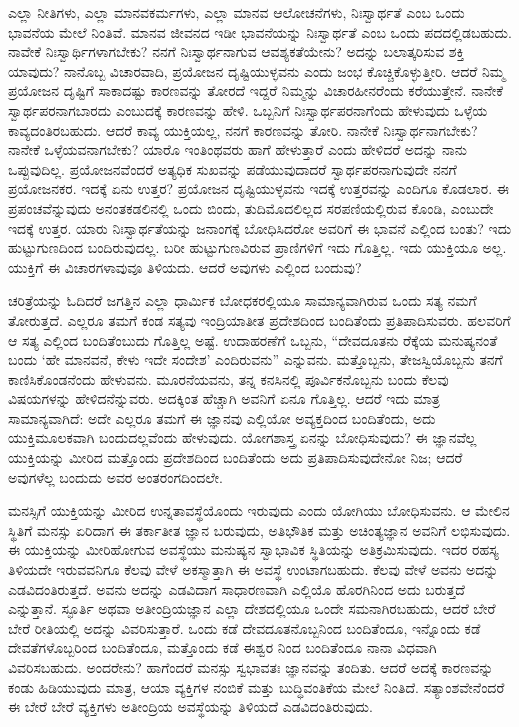 \vskip 0.3cm

ಎಲ್ಲಾ ನೀತಿಗಳು, ಎಲ್ಲಾ ಮಾನವಕರ್ಮಗಳು, ಎಲ್ಲಾ ಮಾನವ ಆಲೋಚನೆಗಳು, ನಿಃಸ್ವಾರ್ಥತೆ ಎಂಬ ಒಂದು ಭಾವನೆಯ ಮೇಲೆ ನಿಂತಿವೆ. ಮಾನವ ಜೀವನದ ಇಡೀ ಭಾವನೆಯನ್ನು ನಿಃಸ್ವಾರ್ಥತೆ ಎಂಬ ಒಂದು ಪದದಲ್ಲಿಡಬಹುದು. ನಾವೇಕೆ ನಿಃಸ್ವಾರ್ಥಿಗಳಾಗಬೇಕು? ನನಗೆ ನಿಃಸ್ವಾರ್ಥನಾಗುವ ಆವಶ್ಯಕತೆಯೇನು? ಅದನ್ನು ಬಲಾತ್ಕರಿಸುವ ಶಕ್ತಿ ಯಾವುದು? ನಾನೊಬ್ಬ ವಿಚಾರವಾದಿ, ಪ್ರಯೋಜನ ದೃಷ್ಟಿಯುಳ್ಳವನು ಎಂದು ಜಂಭ ಕೊಚ್ಚಿಕೊಳ್ಳುತ್ತೀರಿ. ಆದರೆ ನಿಮ್ಮ ಪ್ರಯೋಜನ ದೃಷ್ಟಿಗೆ ಸಾಕಾದಷ್ಟು ಕಾರಣವನ್ನು ತೋರದೆ ಇದ್ದರೆ ನಿಮ್ಮನ್ನು ವಿಚಾರಹೀನರೆಂದು ಕರೆಯುತ್ತೇನೆ. ನಾನೇಕೆ ಸ್ವಾರ್ಥಪರನಾಗಬಾರದು ಎಂಬುದಕ್ಕೆ ಕಾರಣವನ್ನು ಹೇಳಿ. ಒಬ್ಬನಿಗೆ ನಿಃಸ್ವಾರ್ಥಪರನಾಗೆಂದು ಹೇಳುವುದು ಒಳ್ಳೆಯ ಕಾವ್ಯದಂತಿರಬಹುದು. ಆದರೆ ಕಾವ್ಯ ಯುಕ್ತಿಯಲ್ಲ, ನನಗೆ ಕಾರಣವನ್ನು ತೋರಿ. ನಾನೇಕೆ ನಿಃಸ್ವಾರ್ಥನಾಗಬೇಕು? ನಾನೇಕೆ ಒಳ್ಳೆಯವನಾಗಬೇಕು? ಯಾರೊ ಇಂತಿಂಥವರು ಹಾಗೆ ಹೇಳುತ್ತಾರೆ ಎಂದು ಹೇಳಿದರೆ ಅದನ್ನು ನಾನು ಒಪ್ಪುವುದಿಲ್ಲ. ಪ್ರಯೋಜನವೆಂದರೆ ಅತ್ಯಧಿಕ ಸುಖವನ್ನು ಪಡೆಯುವುದಾದರೆ ಸ್ವಾರ್ಥಪರನಾಗುವುದೇ ನನಗೆ ಪ್ರಯೋಜನಕರ. ಇದಕ್ಕೆ ಏನು ಉತ್ತರ? ಪ್ರಯೋಜನ ದೃಷ್ಟಿಯುಳ್ಳವನು ಇದಕ್ಕೆ ಉತ್ತರವನ್ನು ಎಂದಿಗೂ ಕೊಡಲಾರ. ಈ ಪ್ರಪಂಚವೆನ್ನುವುದು ಅನಂತಕಡಲಿನಲ್ಲಿ ಒಂದು ಬಿಂದು, ತುದಿಮೊದಲಿಲ್ಲದ ಸರಪಣಿಯಲ್ಲಿರುವ ಕೊಂಡಿ, ಎಂಬುದೇ ಇದಕ್ಕೆ ಉತ್ತರ. ಯಾರು ನಿಃಸ್ವಾರ್ಥತೆಯನ್ನು ಜನಾಂಗಕ್ಕೆ ಬೋಧಿಸಿದರೋ ಅವರಿಗೆ ಈ ಭಾವನೆ ಎಲ್ಲಿಂದ ಬಂತು? ಇದು ಹುಟ್ಟುಗುಣದಿಂದ ಬಂದಿರುವುದಲ್ಲ. ಬರೀ ಹುಟ್ಟುಗುಣವಿರುವ ಪ್ರಾಣಿಗಳಿಗೆ ಇದು ಗೊತ್ತಿಲ್ಲ. ಇದು ಯುಕ್ತಿಯೂ ಅಲ್ಲ. ಯುಕ್ತಿಗೆ ಈ ವಿಚಾರಗಳಾವುವೂ ತಿಳಿಯದು. ಆದರೆ ಅವುಗಳು ಎಲ್ಲಿಂದ ಬಂದುವು?

\vskip 0.3cm

ಚರಿತ್ರೆಯನ್ನು ಓದಿದರೆ ಜಗತ್ತಿನ ಎಲ್ಲಾ ಧಾರ್ಮಿಕ ಬೋಧಕರಲ್ಲಿಯೂ ಸಾಮಾನ್ಯವಾಗಿರುವ ಒಂದು ಸತ್ಯ ನಮಗೆ ತೋರುತ್ತದೆ. ಎಲ್ಲರೂ ತಮಗೆ ಕಂಡ ಸತ್ಯವು ಇಂದ್ರಿಯಾತೀತ ಪ್ರದೇಶದಿಂದ ಬಂದಿತೆಂದು ಪ್ರತಿಪಾದಿಸುವರು. ಹಲವರಿಗೆ ಆ ಸತ್ಯ ಎಲ್ಲಿಂದ ಬಂದಿತೆಂಬುದು ಗೊತ್ತಿಲ್ಲ ಅಷ್ಟೆ. ಉದಾಹರಣೆಗೆ ಒಬ್ಬನು, “ದೇವದೂತನು ರೆಕ್ಕೆಯ ಮನುಷ್ಯನಂತೆ ಬಂದು ‘ಹೇ ಮಾನವನೆ, ಕೇಳು ಇದೇ ಸಂದೇಶ’ ಎಂದಿರುವನು” ಎನ್ನುವನು. ಮತ್ತೊಬ್ಬನು, ತೇಜಸ್ವಿಯೊಬ್ಬನು ತನಗೆ ಕಾಣಿಸಿಕೊಂಡನೆಂದು ಹೇಳುವನು. ಮೂರನೆಯವನು, ತನ್ನ ಕನಸಿನಲ್ಲಿ ಪೂರ್ವಿಕನೊಬ್ಬನು ಬಂದು ಕೆಲವು ವಿಷಯಗಳನ್ನು ಹೇಳಿದನೆನ್ನುವರು. ಅದಕ್ಕಿಂತ ಹೆಚ್ಚಾಗಿ ಅವನಿಗೆ ಏನೂ ಗೊತ್ತಿಲ್ಲ. ಆದರೆ ಇದು ಮಾತ್ರ ಸಾಮಾನ್ಯವಾಗಿದೆ: ಅದೇ ಎಲ್ಲರೂ ತಮಗೆ ಈ ಜ್ಞಾನವು ಎಲ್ಲಿಯೋ ಅವ್ಯಕ್ತದಿಂದ ಬಂದಿತೆಂದು, ಅದು ಯುಕ್ತಿಮೂಲಕವಾಗಿ ಬಂದುದಲ್ಲವೆಂದು ಹೇಳುವುದು. ಯೋಗಶಾಸ್ತ್ರ ಏನನ್ನು ಬೋಧಿಸುವುದು? ಈ ಜ್ಞಾನವೆಲ್ಲ ಯುಕ್ತಿಯನ್ನು ಮೀರಿದ ಮತ್ತೊಂದು ಪ್ರದೇಶದಿಂದ ಬಂದಿತೆಂದು ಅದು ಪ್ರತಿಪಾದಿಸುವುದೇನೋ ನಿಜ; ಆದರೆ ಅವುಗಳೆಲ್ಲ ಬಂದುದು ಅವರ ಅಂತರಂಗದಿಂದಲೇ. 

\vskip 0.3cm

ಮನಸ್ಸಿಗೆ ಯುಕ್ತಿಯನ್ನು ಮೀರಿದ ಉನ್ನತಾವಸ್ಥೆಯೊಂದು ಇರುವುದು ಎಂದು ಯೋಗಿಯು ಬೋಧಿಸುವನು. ಆ ಮೇಲಿನ ಸ್ಥಿತಿಗೆ ಮನಸ್ಸು ಏರಿದಾಗ ಈ ತರ್ಕಾತೀತ ಜ್ಞಾನ ಬರುವುದು, ಅತಿಭೌತಿಕ ಮತ್ತು ಅಚಿಂತ್ಯಜ್ಞಾನ ಅವನಿಗೆ ಲಭಿಸುವುದು. ಈ ಯುಕ್ತಿಯನ್ನು ಮೀರಿಹೋಗುವ ಅವಸ್ಥೆಯು ಮನುಷ್ಯನ ಸ್ವಾಭಾವಿಕ ಸ್ಥಿತಿಯನ್ನು ಅತಿಕ್ರಮಿಸುವುದು. ಇದರ ರಹಸ್ಯ ತಿಳಿಯದೇ ಇರುವವನಿಗೂ ಕೆಲವು ವೇಳೆ ಅಕಸ್ಮಾತ್ತಾಗಿ ಈ ಅವಸ್ಥೆ ಉಂಟಾಗಬಹುದು. ಕೆಲವು ವೇಳೆ ಅವನು ಅದನ್ನು ಎಡವಿದಂತಿರುತ್ತದೆ. ಅವನು ಅದನ್ನು ಎಡವಿದಾಗ ಸಾಧಾರಣವಾಗಿ ಎಲ್ಲಿಯೊ ಹೊರಗಿನಿಂದ ಅದು ಬರುತ್ತದೆ ಎನ್ನುತ್ತಾನೆ. ಸ್ಫೂರ್ತಿ ಅಥವಾ ಅತೀಂದ್ರಿಯಜ್ಞಾನ ಎಲ್ಲಾ ದೇಶದಲ್ಲಿಯೂ ಒಂದೇ ಸಮನಾಗಿರಬಹುದು, ಆದರೆ ಬೇರೆ ಬೇರೆ ರೀತಿಯಲ್ಲಿ ಅದನ್ನು ವಿವರಿಸುತ್ತಾರೆ. ಒಂದು ಕಡೆ ದೇವದೂತನೊಬ್ಬನಿಂದ ಬಂದಿತೆಂದೂ, ಇನ್ನೊಂದು ಕಡೆ ದೇವತೆಗಳೊಬ್ಬರಿಂದ ಬಂದಿತೆಂದೂ, ಮತ್ತೊಂದು ಕಡೆ ಈಶ್ವರ ನಿಂದ ಬಂದಿತೆಂದೂ ನಾನಾ ವಿಧವಾಗಿ ವಿವರಿಸಬಹುದು. ಅಂದರೇನು? ಹಾಗೆಂದರೆ ಮನಸ್ಸು ಸ್ವಭಾವತಃ ಜ್ಞಾನವನ್ನು ತಂದಿತು. ಆದರೆ ಅದಕ್ಕೆ ಕಾರಣವನ್ನು ಕಂಡು ಹಿಡಿಯುವುದು ಮಾತ್ರ, ಆಯಾ ವ್ಯಕ್ತಿಗಳ ನಂಬಿಕೆ ಮತ್ತು ಬುದ್ಧಿವಂತಿಕೆಯ ಮೇಲೆ ನಿಂತಿದೆ. ಸತ್ಯಾಂಶವೇನೆಂದರೆ ಈ ಬೇರೆ ಬೇರೆ ವ್ಯಕ್ತಿಗಳು ಅತೀಂದ್ರಿಯ ಅವಸ್ಥೆಯನ್ನು ತಿಳಿಯದೆ ಎಡವಿದಂತಿರುವುದು. 

